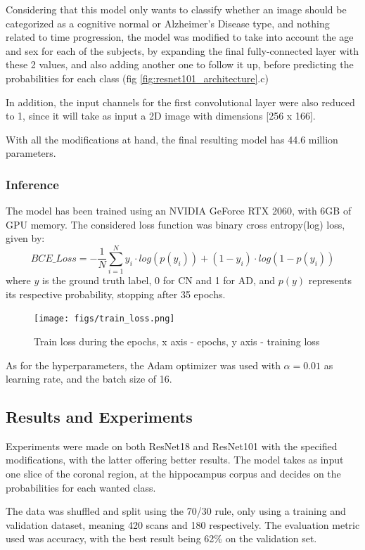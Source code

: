 \documentclass[a4paper, 12pt]{article}
\begin{document}
Considering that this model only wants to classify whether an image should be categorized as a cognitive normal or Alzheimer's Disease type,
and nothing related to time progression, the model was modified to take into account the age and sex for each of the subjects, by expanding
the final fully-connected layer with these 2 values, and also adding another one to follow it up, before predicting the probabilities for each class
(fig \ref{fig:resnet101_architecture}.c)

In addition, the input channels for the first convolutional layer were also reduced to 1, since it will take as input a 2D image with
dimensions [256 x 166].

With all the modifications at hand, the final resulting model has 44.6 million parameters.

\subsubsection{Inference}
The model has been trained using an NVIDIA GeForce RTX 2060, with 6GB of GPU memory. The considered loss function was
binary cross entropy(log) loss, given by:
$$
    BCE\_Loss = - \frac{1}{N} \sum_{i=1}^{N}y_i \cdot log(p(y_i)) + (1 - y_i) \cdot log(1 - p(y_i))
$$
where $y$ is the ground truth label, 0 for CN and 1 for AD, and $p(y)$ represents its respective probability, stopping
after 35 epochs.

\begin{figure}[htbp]
    \centering
    \texttt{[image: figs/train\_loss.png]}
    \caption{Train loss during the epochs, x axis - epochs, y axis - training loss}
    \label{fig:train_loss}
\end{figure}

As for the hyperparameters, the Adam optimizer was used with $\alpha = 0.01$ as learning rate, and the batch size of 16.

\newpage
\subsection{Results and Experiments}
Experiments were made on both ResNet18 and ResNet101 with the specified modifications, with the latter offering better
results. The model takes as input one slice of the coronal region, at the hippocampus corpus and decides on the
probabilities for each wanted class.

The data was shuffled and split using the 70/30 rule, only using a training and validation dataset, meaning 420 scans and
180 respectively. The evaluation metric used was accuracy, with the best result being 62\% on the validation set.
\end{document}
